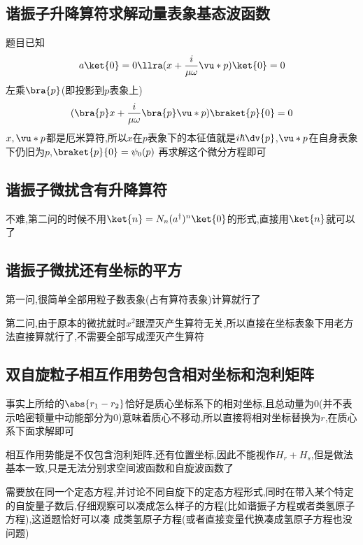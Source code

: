         \subsection{谐振子升降算符求解动量表象基态波函数}
            题目已知
            $$
            a \ket{0} = 0 \llra (x + \frac{i}{\mu \omega} \vu*{p}) \ket{0} = 0
            $$
            左乘$\bra{p}$(即投影到$p$表象上)
            $$
            (\bra{p}x + \frac{i}{\mu \omega} \bra{p}\vu*{p}) \braket{p}{0} = 0
            $$
            $x,\vu*{p}$都是厄米算符,所以$x$在$p$表象下的本征值就是$i\hbar \dv{p} $,$\vu*{p}$在自身表象下仍旧为$p$,$\braket{p}{0} = \psi_{0}(p)$
            再求解这个微分方程即可                                                                                                                                                                                                                                                   


        \subsection{谐振子微扰含有升降算符}
            不难,第二问的时候不用$\ket{n} = N_{n} (a^{\dagger})^{n} \ket{0}$的形式,直接用$\ket{n}$就可以了

        \subsection{谐振子微扰还有坐标的平方}
            第一问,很简单全部用粒子数表象(占有算符表象)计算就行了

            第二问,由于原本的微扰就时$x^{2}$跟湮灭产生算符无关,所以直接在坐标表象下用老方法直接算就行了,不需要全部写成湮灭产生算符
        
        \subsection{双自旋粒子相互作用势包含相对坐标和泡利矩阵}
            

            事实上所给的$\abs{r_{1}-r_{2}}$恰好是质心坐标系下的相对坐标,且总动量为0(并不表示哈密顿量中动能部分为0)意味着质心不移动,所以直接将相对坐标替换为$r$,在质心
            系下面求解即可
            
            相互作用势能是不仅包含泡利矩阵,还有位置坐标,因此不能视作$H_{r}+H_{s}$,但是做法基本一致,只是无法分别求空间波函数和自旋波函数了

            需要放在同一个定态方程,并讨论不同自旋下的定态方程形式,同时在带入某个特定的自旋量子数后,仔细观察可以凑成怎么样子的方程(比如谐振子方程或者类氢原子方程),这道题恰好可以凑
            成类氢原子方程(或者直接变量代换凑成氢原子方程也没问题)

